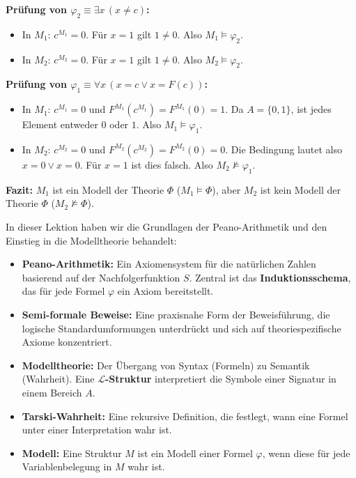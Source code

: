 \begin{math-stroke}
\textbf{Prüfung von $\varphi_2 \equiv \exists x \, (x \neq c)$:}
\begin{itemize}
    \item In $M_1$: $c^{M_1} = 0$. Für $x=1$ gilt $1 \neq 0$. Also $M_1 \models \varphi_2$.
    \item In $M_2$: $c^{M_2} = 0$. Für $x=1$ gilt $1 \neq 0$. Also $M_2 \models \varphi_2$.
\end{itemize}

\textbf{Prüfung von $\varphi_1 \equiv \forall x \, (x = c \lor x = F(c))$:}
\begin{itemize}
    \item In $M_1$: $c^{M_1} = 0$ und $F^{M_1}(c^{M_1}) = F^{M_1}(0) = 1$. Da $A = \{0, 1\}$, ist jedes Element entweder $0$ oder $1$. Also $M_1 \models \varphi_1$.
    \item In $M_2$: $c^{M_2} = 0$ und $F^{M_2}(c^{M_2}) = F^{M_2}(0) = 0$. Die Bedingung lautet also $x = 0 \lor x = 0$. Für $x=1$ ist dies falsch. Also $M_2 \not\models \varphi_1$.
\end{itemize}

\textbf{Fazit:}
$M_1$ ist ein Modell der Theorie $\Phi$ ($M_1 \models \Phi$), aber $M_2$ ist kein Modell der Theorie $\Phi$ ($M_2 \not\models \Phi$).
\end{math-stroke}

\begin{nice-box}
In dieser Lektion haben wir die Grundlagen der Peano-Arithmetik und den Einstieg in die Modelltheorie behandelt:
\begin{itemize}
    \item \textbf{Peano-Arithmetik:} Ein Axiomensystem für die natürlichen Zahlen basierend auf der Nachfolgerfunktion $S$. Zentral ist das \textbf{Induktionsschema}, das für jede Formel $\varphi$ ein Axiom bereitstellt.
    \item \textbf{Semi-formale Beweise:} Eine praxisnahe Form der Beweisführung, die logische Standardumformungen unterdrückt und sich auf theoriespezifische Axiome konzentriert.
    \item \textbf{Modelltheorie:} Der Übergang von Syntax (Formeln) zu Semantik (Wahrheit). Eine \textbf{$\mathcal{L}$-Struktur} interpretiert die Symbole einer Signatur in einem Bereich $A$.
    \item \textbf{Tarski-Wahrheit:} Eine rekursive Definition, die festlegt, wann eine Formel unter einer Interpretation wahr ist.
    \item \textbf{Modell:} Eine Struktur $M$ ist ein Modell einer Formel $\varphi$, wenn diese für jede Variablenbelegung in $M$ wahr ist.
\end{itemize}
\end{nice-box}